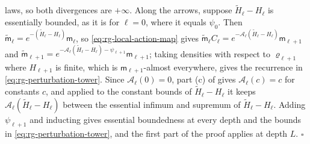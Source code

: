 laws, so both divergences are $+\infty$. Along the arrows, suppose
$\widetilde H_\ell-H_\ell$ is essentially bounded, as it is for $\ell=0$, where it
equals $\psi_0$. Then $\widetilde{\mathsf m}_\ell=e^{-(\widetilde H_\ell-H_\ell)}\mathsf
m_\ell$, so \eqref{eq:rg-local-action-map} gives
$\widetilde{\mathsf m}_\ell C_\ell=e^{-\mathcal A_\ell(\widetilde H_\ell-H_\ell)}\mathsf
m_{\ell+1}$ and
$\widetilde{\mathsf m}_{\ell+1}=e^{-\mathcal A_\ell(\widetilde H_\ell-H_\ell)
-\psi_{\ell+1}}\mathsf m_{\ell+1}$; taking densities with respect to
$\varrho_{\ell+1}$ where $H_{\ell+1}$ is finite, which is $\mathsf m_{\ell+1}$-almost
everywhere, gives the recurrence in \eqref{eq:rg-perturbation-tower}. Since
$\mathcal A_\ell(0)=0$, part (c) of  gives
$\mathcal A_\ell(c)=c$ for constants $c$, and applied to the constant bounds of
$\widetilde H_\ell-H_\ell$ it keeps $\mathcal A_\ell(\widetilde H_\ell-H_\ell)$
between the essential infimum and supremum of $\widetilde H_\ell-H_\ell$. Adding
$\psi_{\ell+1}$ and inducting gives essential boundedness at every depth and the bounds
in \eqref{eq:rg-perturbation-tower}, and the first part of the proof applies at depth
$L$. $\square$

